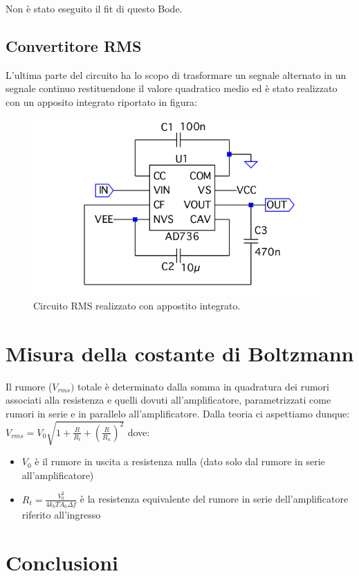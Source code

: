 \documentclass[10pt,a4paper]{article}
\begin{document}
Non è stato eseguito il fit di questo Bode.

\subsection{Convertitore RMS}
L'ultima parte del circuito ha lo scopo di trasformare un segnale alternato in un segnale continuo restituendone il valore quadratico medio ed è stato realizzato con un apposito integrato riportato in figura:


\begin{figure}[!htb]
\centering
\includegraphics[scale=0.3]{rms.png}
\caption{Circuito RMS realizzato con appostito integrato.\label{rms}}
\end{figure}

\section{Misura della costante di Boltzmann}
Il rumore ($V_{rms})$ totale è determinato dalla somma in quadratura dei rumori associati alla resistenza e quelli dovuti all'amplificatore, parametrizzati come rumori in serie e in parallelo all'amplificatore. Dalla teoria ci aspettiamo dunque: $V_{rms} = V_0 \sqrt{1+\frac{R}{R_t}+(\frac{R}{R_n})^2}$ dove:
\begin{itemize}
\item $V_0$ è il rumore in uscita a resistenza nulla (dato solo dal rumore in serie all'amplificatore)
\item $R_t = \frac{V_0^2}{4 k_b T A_0 \Delta f}$ è la resistenza equivalente del rumore in serie dell'amplificatore riferito all'ingresso
\end{itemize}




\section{Conclusioni}
\end{document}
